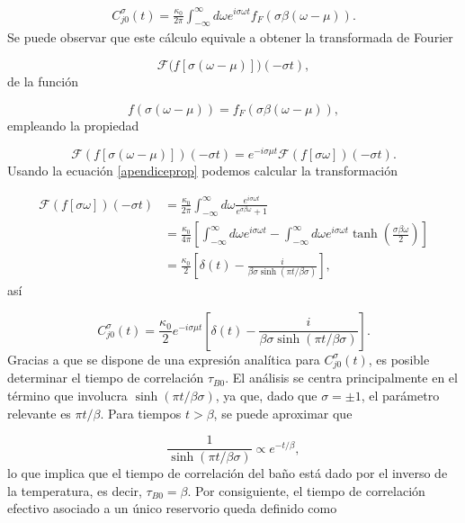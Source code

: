\begin{appendixs}
\begin{align*}
       C_{j0}^{\sigma}(t) = \frac{\kappa_{0}}{2\pi} \int_{-\infty}^{\infty} d\omega e^{i\sigma \omega t }f_{F}(\sigma \beta (\omega -  \mu)).
\end{align*}    
Se puede  observar que este cálculo equivale a obtener la transformada de Fourier 

\[
\mathcal{F}\big(f[\sigma (\omega - \mu)]\big)(-\sigma t),
\]
de la función 

\[
f(\sigma(\omega-\mu)) = f_{F}(\sigma \beta (\omega-\mu)),
\]
empleando la propiedad

\begin{equation}
\mathcal{F}(f[\sigma (\omega - \mu)])(-\sigma t) = e^{-i \sigma \mu t}\mathcal{F}(f[\sigma \omega])(-\sigma t).
\label{apendiceprop}
\end{equation}
Usando la ecuación \eqref{apendiceprop} podemos calcular la transformación

\begin{align*}
    \mathcal{F}(f[\sigma \omega])(-\sigma t) &= \frac{\kappa_{0}}{2\pi} \int_{-\infty}^{\infty} d\omega \frac{e^{i\sigma \omega t}}{e^{\sigma \beta \omega} +1 } \\
        & = \frac{\kappa_{0}}{4\pi} \left[\int_{-\infty}^{\infty}d \omega e^{i\sigma \omega t} - \int_{-\infty}^{\infty}d\omega e^{i\sigma \omega t} \tanh \left(\frac{ \sigma \beta \omega }{2} \right)   \right] \\
        & =  \frac{\kappa_{0}}{2} \left[\delta(t) - \frac{i}{\beta \sigma \sinh(\pi t/\beta \sigma)} \right],
\end{align*}
así

\begin{equation*}
    C^{\sigma}_{j0}(t) = \frac{\kappa_{0}}{2}e^{-i\sigma \mu t} \left[\delta(t) - \frac{i}{\beta \sigma \sinh(\pi t/\beta \sigma)} \right].
\end{equation*}
Gracias a que se dispone de una expresión analítica para $C^{\sigma}_{j0}(t)$, es posible determinar el tiempo de correlación $\tau_{B0}$. El análisis se centra principalmente en el término que involucra $\sinh(\pi t/\beta \sigma)$, ya que, dado que $\sigma = \pm 1$, el parámetro relevante es $\pi t/\beta$. Para tiempos $t > \beta$, se puede aproximar que 

\[
\frac{1}{\sinh(\pi t/\beta \sigma)} \propto e^{-t/\beta},
\]
lo que implica que el tiempo de correlación del baño está dado por el inverso de la temperatura, es decir, $\tau_{B0} = \beta$. Por consiguiente, el tiempo de correlación efectivo asociado a un único reservorio queda definido como


\end{appendixs}
